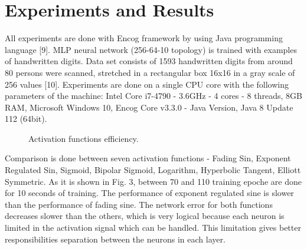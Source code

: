\documentclass{llncs}
\begin{document}
\section{Experiments and Results}
%
All experiments are done with Encog framework by using Java programming language [9]. MLP neural network  (256-64-10 topology) is trained with examples of handwritten digits. Data set consists of 1593 handwritten digits from around 80 persons were scanned, stretched in a rectangular box 16x16 in a gray scale of 256 values [10]. Experiments are done on a single CPU core with the following parameters of the machine: Intel Core i7-4790 - 3.6GHz - 4 cores - 8 threads, 8GB RAM, Microsoft Windows 10, Encog Core v3.3.0 - Java Version, Java 8 Update 112 (64bit). 
%
\begin{figure}
    \centering
    \caption{Activation functions efficiency.}
    \label{fig:fig02}
\end{figure}
\FloatBarrier
%
Comparison is done between seven activation functions - Fading Sin, Exponent Regulated Sin, Sigmoid, Bipolar Sigmoid, Logarithm, Hyperbolic Tangent, Elliott Symmetric. As it is shown in Fig. 3, between 70 and 110 training epoche are done for 10 seconds of training. The performance of exponent regulated sine is slower than the performance of fading sine. The network error for both functions decreases slower than the others, which is very logical because each neuron is limited in the activation signal which can be handled. This limitation gives better responsibilities separation between the neurons in each layer. 
%
\end{document}
